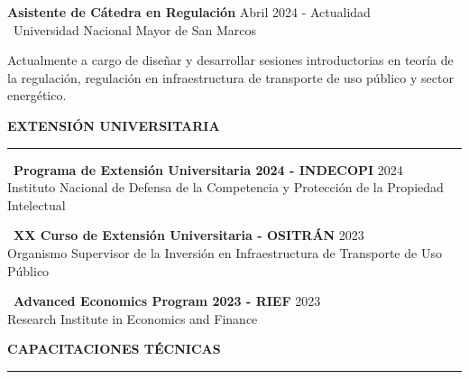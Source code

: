 \documentclass{resume}
\begin{document}
\vspace{2mm}

\noindent {\color{vino} \faBriefcase} \; {\bf Asistente de Cátedra en Regulación} \hfill
{\color{vino}\faCalendarCheckO} {Abril 2024 - Actualidad} \\
{\color{vino}\faInstitution} \, {Universidad Nacional Mayor de San Marcos}

\vspace{2mm}

\noindent Actualmente a cargo de diseñar y desarrollar sesiones introductorias en teoría de la regulación,
regulación en infraestructura de transporte de uso público y sector energético.

\vspace{5mm}


{\color{vino} \noindent\MakeUppercase{\large \bf Extensión Universitaria} \\
\rule[3mm]{\textwidth}{0.5mm}}

\noindent {\color{vino} \faMortarBoard} \, {\bf Programa de Extensión Universitaria 2024 - INDECOPI} \hfill
{\color{vino}\faCalendarCheckO} {2024} \\
{\color{vino} \faInstitution} \; {Instituto Nacional de Defensa de la Competencia y Protección de la Propiedad Intelectual}

\vspace{3mm}

\noindent {\color{vino} \faMortarBoard} \, {\bf XX Curso de Extensión Universitaria - OSITRÁN} \hfill
{\color{vino}\faCalendarCheckO} {2023} \\
{\color{vino}\faInstitution} \; {Organismo Supervisor de la Inversión en Infraestructura de Transporte de Uso Público}

\vspace{3mm}

\noindent {\color{vino}\faMortarBoard} \, {\bf Advanced Economics Program 2023 - RIEF} \hfill
{\color{vino}\faCalendarCheckO} {2023} \\
{\color{vino}\faInstitution} \; {Research Institute in Economics and Finance}

\vspace{5mm}


{\color{vino} \noindent\MakeUppercase{\large \bf Capacitaciones Técnicas} \\
\rule[3mm]{\textwidth}{0.5mm}}
\end{document}
